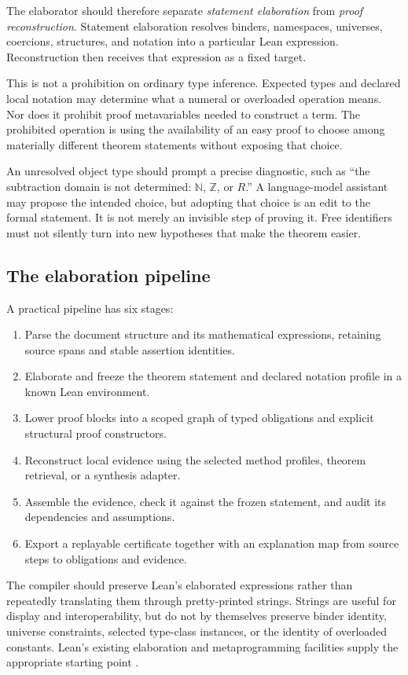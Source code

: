 \documentclass[11pt,a4paper]{article}
\newcommand{\NN}{\mathbb N}
\newcommand{\ZZ}{\mathbb Z}
\begin{document}
The elaborator should therefore separate \emph{statement elaboration} from \emph{proof reconstruction}. Statement elaboration resolves binders, namespaces, universes, coercions, structures, and notation into a particular Lean expression. Reconstruction then receives that expression as a fixed target.

This is not a prohibition on ordinary type inference. Expected types and declared local notation may determine what a numeral or overloaded operation means. Nor does it prohibit proof metavariables needed to construct a term. The prohibited operation is using the availability of an easy proof to choose among materially different theorem statements without exposing that choice.

An unresolved object type should prompt a precise diagnostic, such as ``the subtraction domain is not determined: $\NN$, $\ZZ$, or $R$.'' A language-model assistant may propose the intended choice, but adopting that choice is an edit to the formal statement. It is not merely an invisible step of proving it. Free identifiers must not silently turn into new hypotheses that make the theorem easier.

\subsection{The elaboration pipeline}

A practical pipeline has six stages:
\begin{enumerate}
\item Parse the document structure and its mathematical expressions, retaining source spans and stable assertion identities.
\item Elaborate and freeze the theorem statement and declared notation profile in a known Lean environment.
\item Lower proof blocks into a scoped graph of typed obligations and explicit structural proof constructors.
\item Reconstruct local evidence using the selected method profiles, theorem retrieval, or a synthesis adapter.
\item Assemble the evidence, check it against the frozen statement, and audit its dependencies and assumptions.
\item Export a replayable certificate together with an explanation map from source steps to obligations and evidence.
\end{enumerate}

The compiler should preserve Lean's elaborated expressions rather than repeatedly translating them through pretty-printed strings. Strings are useful for display and interoperability, but do not by themselves preserve binder identity, universe constraints, selected type-class instances, or the identity of overloaded constants. Lean's existing elaboration and metaprogramming facilities supply the appropriate starting point \cite{leanelaboration,lean4paper}.
\end{document}
